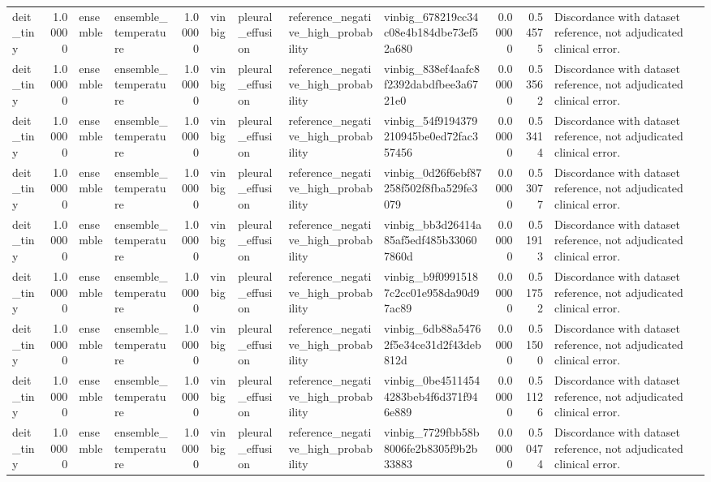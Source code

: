 \begin{tabular}{lrllrllllrrl}
deit\_tiny & 1.00000 & ensemble & ensemble\_temperature & 1.00000 & vinbig & pleural\_effusion & reference\_negative\_high\_probability & vinbig\_678219cc34c08e4b184dbe73ef52a680 & 0.00000 & 0.54575 & Discordance with dataset reference, not adjudicated clinical error. \\
deit\_tiny & 1.00000 & ensemble & ensemble\_temperature & 1.00000 & vinbig & pleural\_effusion & reference\_negative\_high\_probability & vinbig\_838ef4aafc8f2392dabdfbee3a6721e0 & 0.00000 & 0.53562 & Discordance with dataset reference, not adjudicated clinical error. \\
deit\_tiny & 1.00000 & ensemble & ensemble\_temperature & 1.00000 & vinbig & pleural\_effusion & reference\_negative\_high\_probability & vinbig\_54f9194379210945be0ed72fac357456 & 0.00000 & 0.53414 & Discordance with dataset reference, not adjudicated clinical error. \\
deit\_tiny & 1.00000 & ensemble & ensemble\_temperature & 1.00000 & vinbig & pleural\_effusion & reference\_negative\_high\_probability & vinbig\_0d26f6ebf87258f502f8fba529fe3079 & 0.00000 & 0.53077 & Discordance with dataset reference, not adjudicated clinical error. \\
deit\_tiny & 1.00000 & ensemble & ensemble\_temperature & 1.00000 & vinbig & pleural\_effusion & reference\_negative\_high\_probability & vinbig\_bb3d26414a85af5edf485b330607860d & 0.00000 & 0.51913 & Discordance with dataset reference, not adjudicated clinical error. \\
deit\_tiny & 1.00000 & ensemble & ensemble\_temperature & 1.00000 & vinbig & pleural\_effusion & reference\_negative\_high\_probability & vinbig\_b9f09915187c2cc01e958da90d97ac89 & 0.00000 & 0.51752 & Discordance with dataset reference, not adjudicated clinical error. \\
deit\_tiny & 1.00000 & ensemble & ensemble\_temperature & 1.00000 & vinbig & pleural\_effusion & reference\_negative\_high\_probability & vinbig\_6db88a54762f5e34ce31d2f43deb812d & 0.00000 & 0.51500 & Discordance with dataset reference, not adjudicated clinical error. \\
deit\_tiny & 1.00000 & ensemble & ensemble\_temperature & 1.00000 & vinbig & pleural\_effusion & reference\_negative\_high\_probability & vinbig\_0be45114544283beb4f6d371f946e889 & 0.00000 & 0.51126 & Discordance with dataset reference, not adjudicated clinical error. \\
deit\_tiny & 1.00000 & ensemble & ensemble\_temperature & 1.00000 & vinbig & pleural\_effusion & reference\_negative\_high\_probability & vinbig\_7729fbb58b8006fe2b8305f9b2b33883 & 0.00000 & 0.50474 & Discordance with dataset reference, not adjudicated clinical error. \\

\end{tabular}
